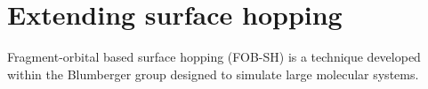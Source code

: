 \chapter{Extending surface hopping}
\label{chap:surface_hopping_ext}
Fragment-orbital based surface hopping (FOB-SH) is a technique developed within the Blumberger group \cite{spencer_fob-sh:_2016} designed to simulate large molecular systems.
